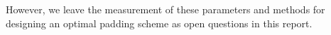 However, we leave the measurement of these parameters and methods for designing an optimal padding scheme as open questions in this report.


%
%
